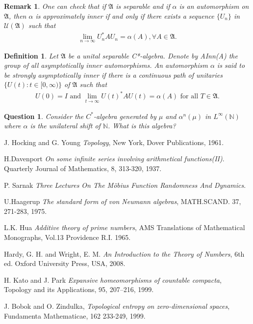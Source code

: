 \documentclass[a4paper,10pt]{amsart}
\newtheorem{definition}{Definition}[section]
\newtheorem{remark}{Remark}[section]
\newtheorem{question}{Question}[section]
\newcommand{\AAA}{\mathfrak A}
\newcommand{\N}{\mathbb N} %
\begin{document}
\begin{remark}
    One can check that if $\AAA$ is separable and if $\alpha$ is
    an automorphism on $\AAA$, then $\alpha$ is approximately inner
    if and only if there exists a sequence $\{U_{n}\}$ in 
    $\mathcal{U}(\AAA)$ such that 
    \begin{align*}
        \lim_{n \rightarrow \infty}U^{*}_{n}AU_{n} = \alpha(A), 
        \forall A \in \AAA.
    \end{align*}
\end{remark}

\begin{definition}
Let $\AAA$ be a unital separable C*-algebra. 
Denote by AInn(A)
the group of all asymptotically inner automorphisms. 
An automorphism $\alpha$ is said to be strongly asymptotically 
inner if there is a continuous path of unitaries 
$\{ U(t): t \in [0, \infty)\}$ of $\AAA$ such that
\begin{align*}
    U(0) = I \mbox{ and } \lim_{t \rightarrow \infty}U(t)^{*}AU(t) =
    \alpha(A) \mbox{ for all } T \in \AAA.
    \end{align*}
\end{definition}

\begin{question}
    Consider the $C^{*}$-algebra generated by $\mu$ and $\alpha^{n}(\mu)$
    in $L^{\infty}(\N)$ where $\alpha$ is the unilateral shift of $\N$.
    What is this algebra?
\end{question}

\begin{thebibliography}{9}
   J. Hocking and G. Young
   \emph{Topology},
   New York, Dover Publications, 1961.

  H.Davenport
  \emph{On some infinite series involving arithmetical functions(II)}.
  Quarterly Journal of Mathematics, 8,
  313-320, 1937.

  P. Sarnak 
  \emph{Three Lectures On The M\"{o}bius Function Randomness And
  Dynamics}.

  U.Haagerup 
  \emph{The standard form of von Neumann algebras},
  MATH.SCAND. 37, 271-283, 1975.

    L.K. Hua
    \emph{Additive theory of prime numbers},
    AMS Translations of Mathematical Monographs, Vol.13
    Providence R.I. 1965.

      Hardy, G. H. and Wright, E. M. 
      \emph{An Introduction to the Theory of Numbers}, 
      6th ed. Oxford University Press, USA, 2008. 

  H. Kato and J. Park
  \emph{Expansive homeomorphisms of countable compacta},
  Topology and its Applications, 95, 207–216, 1999.

    J. Bobok and O. Zindulka,
    \emph{Topological entropy on zero-dimensional spaces},
    Fundamenta Mathematicae, 162 233-249, 1999.

\end{thebibliography}
\end{document}
